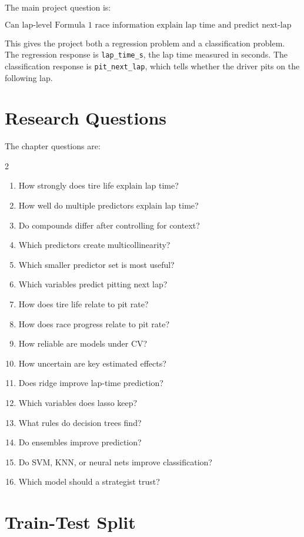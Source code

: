 \documentclass[11pt,oneside,openany]{book}
\begin{document}
The main project question is:

\[
\text{Can lap-level Formula 1 race information explain lap time and predict next-lap pit stops?}
\]

This gives the project both a regression problem and a classification problem. The regression response is \texttt{lap\_time\_s}, the lap time measured in seconds. The classification response is \texttt{pit\_next\_lap}, which tells whether the driver pits on the following lap.

\section{Research Questions}

The chapter questions are:

\begin{multicols}{2}
\begin{enumerate}
    \item How strongly does tire life explain lap time?
    \item How well do multiple predictors explain lap time?
    \item Do compounds differ after controlling for context?
    \item Which predictors create multicollinearity?
    \item Which smaller predictor set is most useful?
    \item Which variables predict pitting next lap?
    \item How does tire life relate to pit rate?
    \item How does race progress relate to pit rate?
    \item How reliable are models under CV?
    \item How uncertain are key estimated effects?
    \item Does ridge improve lap-time prediction?
    \item Which variables does lasso keep?
    \item What rules do decision trees find?
    \item Do ensembles improve prediction?
    \item Do SVM, KNN, or neural nets improve classification?
    \item Which model should a strategist trust?
\end{enumerate}
\end{multicols}

\section{Train-Test Split}
\end{document}
